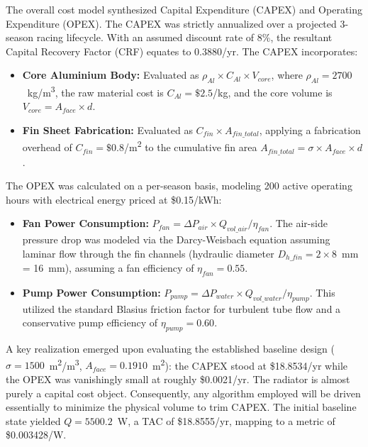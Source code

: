 \documentclass[12pt, a4paper]{article}
\begin{document}
The overall cost model synthesized Capital Expenditure (CAPEX) and Operating Expenditure (OPEX). The CAPEX was strictly annualized over a projected 3-season racing lifecycle. With an assumed discount rate of 8\%, the resultant Capital Recovery Factor (CRF) equates to 0.3880/yr. The CAPEX incorporates:
\begin{itemize}
    \item \textbf{Core Aluminium Body:} Evaluated as $\rho_{Al} \times C_{Al} \times V_{core}$, where $\rho_{Al} = 2700$~kg/m\textsuperscript{3}, the raw material cost is $C_{Al} = \$2.5$/kg, and the core volume is $V_{core} = A_{face} \times d$.
    \item \textbf{Fin Sheet Fabrication:} Evaluated as $C_{fin} \times A_{fin\_total}$, applying a fabrication overhead of $C_{fin} = \$0.8$/m\textsuperscript{2} to the cumulative fin area $A_{fin\_total} = \sigma \times A_{face} \times d$.
\end{itemize}

The OPEX was calculated on a per-season basis, modeling 200 active operating hours with electrical energy priced at \$0.15/kWh:
\begin{itemize}
    \item \textbf{Fan Power Consumption:} $P_{fan} = \Delta P_{air} \times Q_{vol\_air} / \eta_{fan}$. The air-side pressure drop was modeled via the Darcy-Weisbach equation assuming laminar flow through the fin channels (hydraulic diameter $D_{h\_fin} = 2 \times 8$~mm = 16~mm), assuming a fan efficiency of $\eta_{fan} = 0.55$.
    \item \textbf{Pump Power Consumption:} $P_{pump} = \Delta P_{water} \times Q_{vol\_water} / \eta_{pump}$. This utilized the standard Blasius friction factor for turbulent tube flow and a conservative pump efficiency of $\eta_{pump} = 0.60$.
\end{itemize}

A key realization emerged upon evaluating the established baseline design ($\sigma = 1500$~m\textsuperscript{2}/m\textsuperscript{3}, $A_{face} = 0.1910$~m\textsuperscript{2}): the CAPEX stood at \$18.8534/yr while the OPEX was vanishingly small at roughly \$0.0021/yr. The radiator is almost purely a capital cost object. Consequently, any algorithm employed will be driven essentially to minimize the physical volume to trim CAPEX. The initial baseline state yielded $Q = 5500.2$~W, a TAC of \$18.8555/yr, mapping to a metric of \$0.003428/W.
\end{document}
